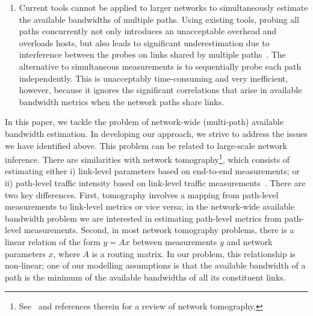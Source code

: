 \documentclass[final,5p,times,twocolumn]{elsarticle}
\begin{document}
\begin{enumerate}
	\item Current tools cannot be applied to larger networks to simultaneously estimate the available bandwidths of multiple paths.  Using existing tools, probing all paths concurrently not only introduces an unacceptable overhead and overloads hosts, but also leads to significant underestimation due to interference between the probes on links shared by multiple paths~\cite{cro:09}. The alternative to simultaneous measurements is to sequentially probe each path independently. This is unacceptably time-consuming and very inefficient, however, because it ignores the significant correlations that arise in available bandwidth metrics when the network paths share links.
\end{enumerate}

In this paper, we tackle the problem of network-wide (multi-path) available bandwidth estimation. In developing our approach, we strive to address the issues we have identified above. This problem can be related to large-scale network inference. There are similarities with network tomography\footnote{See~\cite{cas:04} and references therein for a review of network tomography.}, which consists of estimating either i) link-level parameters based on end-to-end measurements; or ii) path-level traffic intensity based on link-level traffic measurements~\cite{var:96}.  There are two key differences. First, tomography involves a mapping from path-level measurements to link-level metrics or vice versa; in the network-wide available bandwidth problem we are interested in estimating path-level metrics from path-level measurements. Second, in most network tomography problems, there is a linear relation of the form $y=Ax$ between measurements $y$ and network parameters $x$, where $A$ is a routing matrix. In our problem, 
this relationship is non-linear; one of our modelling assumptions is that the available bandwidth of a path is the minimum of the available bandwidths of all its constituent links. 
\end{document}
